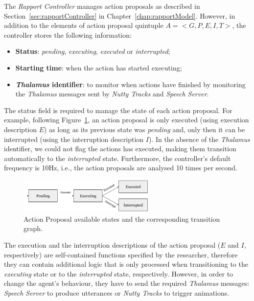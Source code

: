 The \textit{Rapport Controller} manages action proposals as described in Section~\ref{sec:rapportController} in Chapter~\ref{chap:rapportModel}. However, in addition to the elements of action proposal quintuple $A=<G,P,E,I,T>$, the controller stores the following information:
\begin{itemize}
	\item \textbf{Status}: \textit{pending}, \textit{executing}, \textit{executed} or \textit{interrupted};
	\item \textbf{Starting time}: when the action has started executing;
	\item \textbf{\textit{Thalamus} identifier}: to monitor when actions have finished by monitoring the \textit{Thalamus} messages sent by \textit{Nutty Tracks} and \textit{Speech Server}.
\end{itemize}

The status field is required to manage the state of each action proposal. For example, following Figure~\ref{fig:actionProposalStatus}, an action proposal is only executed (using execution description $E$) as long as its previous state was \textit{pending} and, only then it can be interrupted (using the interruption description $I$). In the absence of the \textit{Thalamus} identifier, we could not flag the actions has executed, making them transition automatically to the \textit{interrupted} state. Furthermore, the controller's default frequency is 10Hz, i.e., the action proposals are analysed 10 times per second.

\begin{figure}[H]
	\centering
	\includegraphics[width=0.6\textwidth]{images/ActionProposalCycle.png}
	\caption{Action Proposal available states and the corresponding transition graph.}
	\label{fig:actionProposalStatus}
\end{figure}

The execution and the interruption descriptions of the action proposal ($E$ and $I$, respectively) are self-contained functions specified by the researcher, therefore they can contain additional logic that is only processed when transitioning to the \textit{executing} state or to the \textit{interrupted} state, respectively. However, in order to change the agent's behaviour, they have to send the required \textit{Thalamus} messages: \textit{Speech Server} to produce utterances or \textit{Nutty Tracks} to trigger animations.

